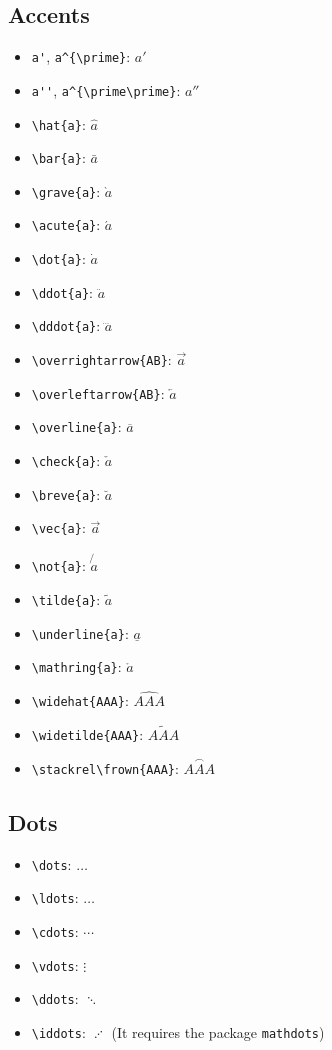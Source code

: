 \documentclass{article}
\begin{document}
\subsection{Accents}

\begin{itemize}
	\item \verb|a'|, \verb|a^{\prime}|: $a'$
	\item \verb|a''|, \verb|a^{\prime\prime}|: $a''$
	\item \verb|\hat{a}|: $\hat{a}$
	\item \verb|\bar{a}|: $\bar{a}$
	\item \verb|\grave{a}|: $\grave{a}$
	\item \verb|\acute{a}|: $\acute{a}$
	\item \verb|\dot{a}|: $\dot{a}$
	\item \verb|\ddot{a}|: $\ddot{a}$
	\item \verb|\dddot{a}|: $\dddot{a}$
	\item \verb|\overrightarrow{AB}|: $\overrightarrow{a}$
	\item \verb|\overleftarrow{AB}|: $\overleftarrow{a}$
	\item \verb|\overline{a}|: $\overline{a}$
	\item \verb|\check{a}|: $\check{a}$
	\item \verb|\breve{a}|: $\breve{a}$
	\item \verb|\vec{a}|: $\vec{a}$
	\item \verb|\not{a}|: $\not{a}$
	\item \verb|\tilde{a}|: $\tilde{a}$
	\item \verb|\underline{a}|: $\underline{a}$
	\item \verb|\mathring{a}|: $\mathring{a}$
	\item \verb|\widehat{AAA}|: $\widehat{AAA}$
	\item \verb|\widetilde{AAA}|: $\widetilde{AAA}$
	\item \verb|\stackrel\frown{AAA}|: $\stackrel\frown{AAA}$
\end{itemize}

\subsection{Dots}

\begin{itemize}
	\item \verb|\dots|: $\dots$
	\item \verb|\ldots|: $\ldots$
	\item \verb|\cdots|: $\cdots$
	\item \verb|\vdots|: $\vdots$
	\item \verb|\ddots|: $\ddots$
	\item \verb|\iddots|: $\iddots$ (It requires the package \verb|mathdots|)
\end{itemize}
\end{document}

